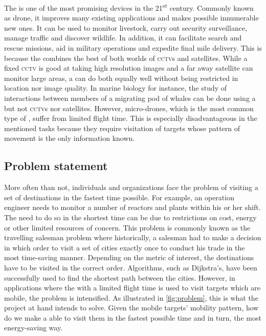 \documentclass[../main.tex]{subfiles}
\begin{document}
The \uav is one of the most promising devices in the 
21\textsuperscript{st} century. Commonly known as drone, 
it improves many existing applications and makes possible 
innumerable new ones. It can be used to monitor livestock, 
carry out security surveillance, manage traffic 
and discover wildlife.
In addition, it can facilitate search and rescue missions,
aid in military operations and expedite final mile delivery.
This is because the \uav combines the best of both worlds
of \textsc{cctv}s and satellites. 
While a fixed \textsc{cctv} is good at taking 
high resolution images and a far away satellite can monitor
large areas, a \uav can do both equally well without 
being restricted in location nor image quality. 
In marine biology for instance,  
the study of interactions between members of a migrating 
pod of whales can be done using a \uav but not 
\textsc{cctv}s nor satellites.
However, micro-drones, which is the most common type of \uavs,
suffer from limited flight time. This is especially 
disadvantageous in
the mentioned tasks because they require visitation of targets
whose pattern of movement is the only information known.

\subsection{Problem statement}

More often than not, individuals and organizations face the problem
of visiting a set of destinations in the fastest time 
possible.
For example, an operation engineer needs to monitor
a number of reactors and plants within his or her shift.
The need to do so in the shortest time can be due to restrictions on
cost, energy or other limited resources of concern.
This problem is commonly known as the travelling salesman problem
where historically, a salesman had to make a decision in which order
to visit a set of cities exactly once to conduct his trade
in the most time-saving manner.
Depending on the metric of interest, 
the destinations have to be visited in the correct order.
Algorithms, such as Dijkstra's, have been successfully used 
to find the shortest path between the cities.
However, in applications where the \uav with a limited
flight time is used to 
visit targets which are mobile, the problem is intensified.
As illustrated in \cref{fig:problem}, this
is what the project at hand intends to solve.
Given the mobile targets' mobility pattern,
how do we make a \uav able to visit them
in the fastest possible time and in turn, 
the most energy-saving way.  
\end{document}
